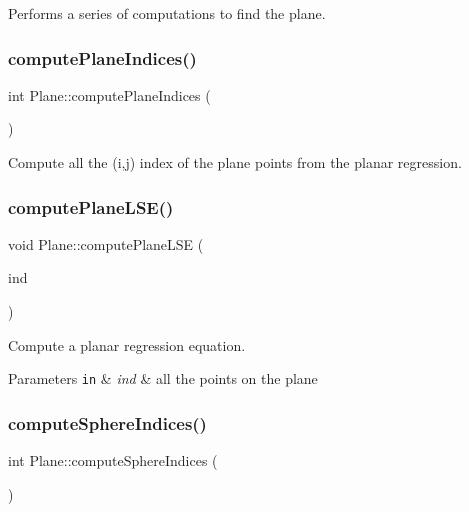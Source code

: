 Performs a series of computations to find the plane. 

\hypertarget{class_plane_a24415419c0c06e83f2016246a8d2ee40}{}\label{class_plane_a24415419c0c06e83f2016246a8d2ee40} 
\subsubsection{\texorpdfstring{compute\+Plane\+Indices()}{computePlaneIndices()}}
{\footnotesize\ttfamily int Plane\+::compute\+Plane\+Indices (\begin{DoxyParamCaption}{ }\end{DoxyParamCaption})\hspace{0.3cm}{\ttfamily [private]}}



Compute all the (i,j) index of the plane points from the planar regression. 

\hypertarget{class_plane_a503b1c82ae3a84d9bd88fbfa37a5e3be}{}\label{class_plane_a503b1c82ae3a84d9bd88fbfa37a5e3be} 
\subsubsection{\texorpdfstring{compute\+Plane\+L\+S\+E()}{computePlaneLSE()}}
{\footnotesize\ttfamily void Plane\+::compute\+Plane\+L\+SE (\begin{DoxyParamCaption}\item[{pcl\+::\+Point\+Indices \&}]{ind }\end{DoxyParamCaption})\hspace{0.3cm}{\ttfamily [private]}}



Compute a planar regression equation. 


\begin{DoxyParams}[1]{Parameters}
\mbox{\tt in}  & {\em ind} & all the points on the plane \\
\hline
\end{DoxyParams}
\hypertarget{class_plane_a279bfd98317431edcdefe43004bb257f}{}\label{class_plane_a279bfd98317431edcdefe43004bb257f} 
\subsubsection{\texorpdfstring{compute\+Sphere\+Indices()}{computeSphereIndices()}}
{\footnotesize\ttfamily int Plane\+::compute\+Sphere\+Indices (\begin{DoxyParamCaption}{ }\end{DoxyParamCaption})\hspace{0.3cm}{\ttfamily [private]}}



